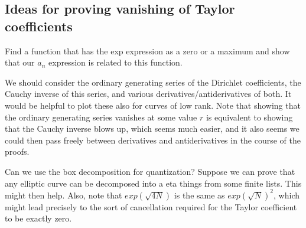 \documentclass[paper=a4, fontsize=11pt]{scrartcl} %
\numberwithin{equation}{section} %
\numberwithin{figure}{section} %
\numberwithin{table}{section} %
\begin{document}
\subsection{Ideas for proving vanishing of Taylor coefficients}


Find a function that has the exp expression as a zero or a maximum and show that our $a_n$ expression is related to this function.

We should consider the ordinary generating series of the Dirichlet coefficients, the Cauchy inverse of this series, and various derivatives/antiderivatives of both. It would be helpful to plot these also for curves of low rank. Note that showing that the ordinary generating series vanishes at some value $r$ is equivalent to showing that the Cauchy inverse blows up, which seems much easier, and it also seems we could then pass freely between derivatives and antiderivatives in the course of the proofs.

Can we use the box decomposition for quantization? Suppose we can prove that any elliptic curve can be decomposed into a eta things from some finite lists. This might then help. Also, note that $exp(\sqrt{4N})$ is the same as $exp(\sqrt{N})^2$, which might lead precisely to the sort of cancellation required for the Taylor coefficient to be exactly zero.




\end{document}
